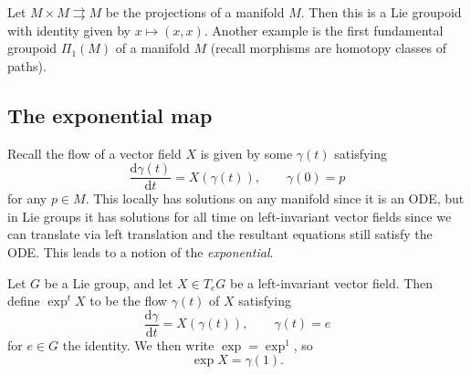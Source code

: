 \begin{example}\label{1.2.4}
	Let $M\times M\rightrightarrows M$ be the projections of a manifold $M$. Then this is a Lie groupoid with identity given by $x\mapsto (x,x)$. Another example is the first fundamental groupoid $\Pi _1(M)$ of a manifold $M$ (recall morphisms are homotopy classes of paths). 
\end{example}

\subsection{The exponential map}

Recall the flow of a vector field $X$ is given by some $\gamma (t)$ satisfying
\[
	\frac{\mathrm{d}\gamma (t)}{\mathrm{d}t} =X(\gamma (t)),\qquad \gamma (0)=p
\]
for any $p\in M$. This locally has solutions on any manifold since it is an ODE, but in Lie groups it has solutions for all time on left-invariant vector fields since we can translate via left translation and the resultant equations still satisfy the ODE. This leads to a notion of the \emph{exponential}.

\begin{definition}\label{1.2.5}
	Let $G$ be a Lie group, and let $X\in T_eG$ be a left-invariant vector field. Then define $\exp ^tX$ to be the flow $\gamma (t)$ of $X$ satisfying
	\[
		\frac{\mathrm{d}\gamma }{\mathrm{d}t} =X(\gamma (t)),\qquad \gamma (t)=e
	\]
	for $e\in G$ the identity. We then write $\exp =\exp ^1$, so
	\[
		\exp X=\gamma (1)
	.\]
\end{definition}
